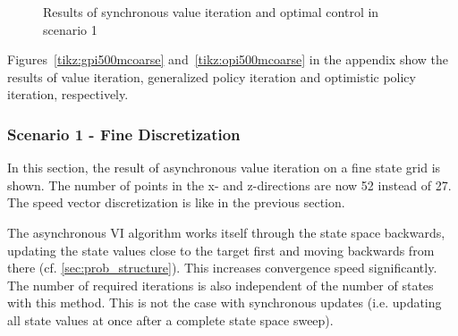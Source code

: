 \begin{figure}[hbt]
	\caption{Results of synchronous value iteration and optimal control in scenario 1}
	\label{tikz:vi500mcoarse}
\end{figure}

Figures~\ref{tikz:gpi500mcoarse} and~\ref{tikz:opi500mcoarse} in the appendix show the results of value iteration, generalized policy iteration and optimistic policy iteration, respectively.

\subsubsection{Scenario 1 - Fine Discretization}

In this section, the result of asynchronous value iteration on a fine state grid is shown. The number of points in the x- and z-directions are now 52 instead of 27. The speed vector discretization is like in the previous section.

The asynchronous VI algorithm works itself through the state space backwards, updating the state values close to the target first and moving backwards from there (cf. \ref{sec:prob_structure}). This increases convergence speed significantly. The number of required iterations is also independent of the number of states with this method. This is not the case with synchronous updates (i.e. updating all state values at once after a complete state space sweep). 

